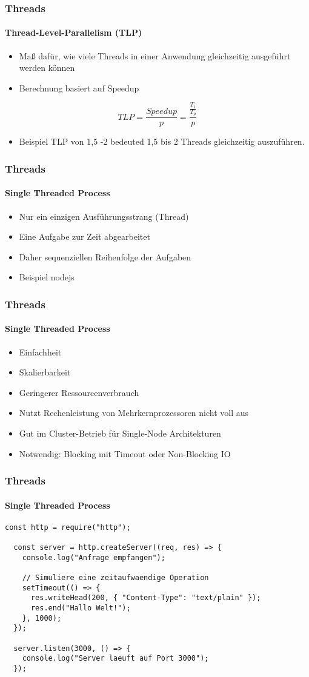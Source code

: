 \begin{frame}
  \frametitle{Threads}
  \framesubtitle{Thread-Level-Parallelism (TLP)}
  \begin{itemize}
    \item Maß dafür, wie viele Threads in einer Anwendung gleichzeitig ausgeführt werden können
    \item Berechnung basiert auf Speedup
  \end{itemize}
  \begin{equation}
    TLP = \frac{Speedup}{p} = \frac{\frac{T_1}{T_p}}{p}
  \end{equation}
  \begin{itemize}
    \item Beispiel TLP von 1,5 -2 bedeuted 1,5 bis 2 Threads gleichzeitig auszuführen.
  \end{itemize}
\end{frame}


\begin{frame}
  \frametitle{Threads}
  \framesubtitle{Single Threaded Process}
  \begin{itemize}
    \item Nur ein einzigen Ausführungsstrang (Thread)
    \item Eine Aufgabe zur Zeit abgearbeitet
    \item Daher sequenziellen Reihenfolge der Aufgaben
    \item Beispiel nodejs
  \end{itemize}
\end{frame}


\begin{frame}
  \frametitle{Threads}
  \framesubtitle{Single Threaded Process}
  \begin{itemize}
    \item Einfachheit
    \item Skalierbarkeit
    \item Geringerer Ressourcenverbrauch
    \item Nutzt Rechenleistung von Mehrkernprozessoren nicht voll aus
    \item Gut im Cluster-Betrieb für Single-Node Architekturen
    \item Notwendig: Blocking mit Timeout oder Non-Blocking IO
  \end{itemize}
\end{frame}


\begin{frame}[fragile]
  \frametitle{Threads}
  \framesubtitle{Single Threaded Process}
  \begin{lstlisting}[caption={Node.js Single Threaded},captionpos=b,label={lst:single}]
  const http = require("http");

  const server = http.createServer((req, res) => {
    console.log("Anfrage empfangen");

    // Simuliere eine zeitaufwaendige Operation
    setTimeout(() => {
      res.writeHead(200, { "Content-Type": "text/plain" });
      res.end("Hallo Welt!");
    }, 1000);
  });

  server.listen(3000, () => {
    console.log("Server laeuft auf Port 3000");
  });
  \end{lstlisting}
\end{frame}

